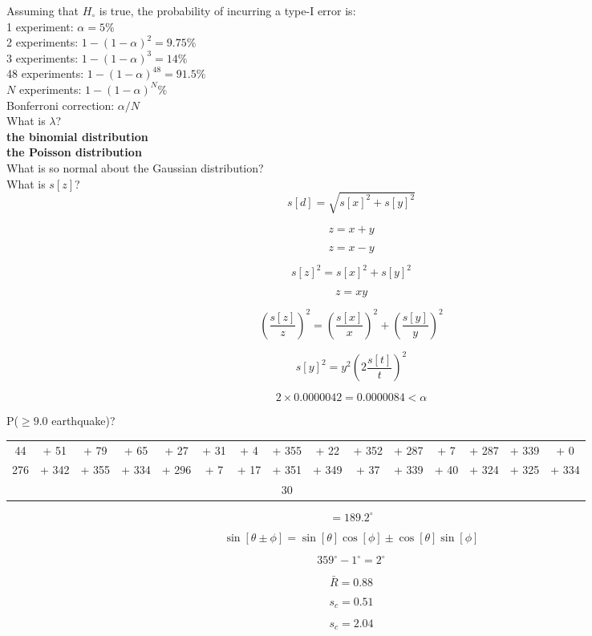 \documentclass{article}
\begin{document}
Assuming that $H_\circ$ is true, the probability of incurring a type-I
error is:\\

1 experiment: $\alpha = 5\%$\\

2 experiments: $1-(1-\alpha)^2=9.75\%$\\

3 experiments: $1-(1-\alpha)^3=14\%$\\

48 experiments:   $1-(1-\alpha)^{48}=91.5\%$\\

$N$ experiments:   $1-(1-\alpha)^{N}\%$\\

Bonferroni correction: $\alpha/N$\\

What is $\lambda$?\\

\textbf{the binomial distribution}\\

\textbf{the Poisson distribution}\\

What is so normal about the Gaussian distribution?\\

What is $s[z]$?\\

\[
s[d] = \sqrt{s[x]^2 + s[y]^2}
\]

\[
z = x + y
\]

\[
z = x - y
\]

\[
s[z]^2 = s[x]^2 + s[y]^2
\]

\[
z = xy
\]

\[
\left(\frac{s[z]}{z}\right)^2 =
\left(\frac{s[x]}{x}\right)^2 + \left(\frac{s[y]}{y}\right)^2
\]

\[
s[y]^2 = y^2\left(2\frac{s[t]}{t}\right)^2
\]

\[
2 \times 0.0000042 = 0.0000084 < \alpha
\]

P($\geq{9.0}$ earthquake)?

\begin{center}
\begin{tabular}{c@{~}c@{~}c@{~}c@{~}c@{~}c@{~}c@{~}c@{~}c@{~}c@{~}c@{~}c@{~}c@{~}c@{~}c}
  44 & + 51 & + 79 & + 65 & + 27 & + 31 & + 4 & + 355 & +
  22 & + 352 & + 287 & + 7 & + 287 & + 339 & + 0 \\
  276 & + 342 & + 355 & + 334 & + 296 & + 7 & + 17 & +
  351 & + 349 & + 37 & + 339 & + 40 & + 324 & + 325 & + 334\\ \hline
  & & & & & & & 30 & & & & & & & 
\end{tabular}
\end{center}

\[
= 189.2^\circ
\]

\[
\sin[\theta\pm\phi] = \sin[\theta]\cos[\phi]\pm\cos[\theta]\sin[\phi]
\]

\[
359^\circ - 1^\circ = 2^\circ
\]

\[
\bar{R} = 0.88
\]

\[
s_c = 0.51
\]

\[
s_c = 2.04
\]
\end{document}
